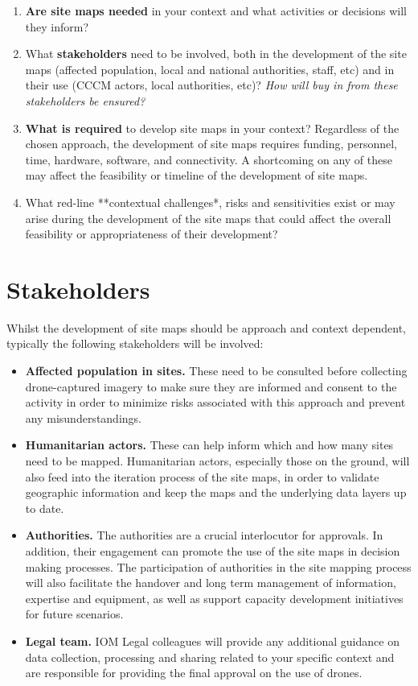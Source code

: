 \documentclass[
  a4paper,
  onecolumn,
  oneside]{book}
\begin{document}
\begin{enumerate}
\def\labelenumi{\arabic{enumi}.}
\item
  \textbf{Are site maps needed} in your context and what activities or
  decisions will they inform?
\item
  What \textbf{stakeholders} need to be involved, both in the
  development of the site maps (affected population, local and national
  authorities, staff, etc) and in their use (CCCM actors, local
  authorities, etc)? \emph{How will buy in from these stakeholders be
  ensured?}
\item
  \textbf{What is required} to develop site maps in your context?
  Regardless of the chosen approach, the development of site maps
  requires funding, personnel, time, hardware, software, and
  connectivity. A shortcoming on any of these may affect the feasibility
  or timeline of the development of site maps.
\item
  What red-line **contextual challenges*, risks and sensitivities exist
  or may arise during the development of the site maps that could affect
  the overall feasibility or appropriateness of their development?
\end{enumerate}

\hypertarget{stakeholders}{%
\section{Stakeholders}\label{stakeholders}}

Whilst the development of site maps should be approach and context
dependent, typically the following stakeholders will be involved:

\begin{itemize}
\item
  \textbf{Affected population in sites.} These need to be consulted
  before collecting drone-captured imagery to make sure they are
  informed and consent to the activity in order to minimize risks
  associated with this approach and prevent any misunderstandings.
\item
  \textbf{Humanitarian actors.} These can help inform which and how many
  sites need to be mapped. Humanitarian actors, especially those on the
  ground, will also feed into the iteration process of the site maps, in
  order to validate geographic information and keep the maps and the
  underlying data layers up to date.
\item
  \textbf{Authorities.} The authorities are a crucial interlocutor for
  approvals. In addition, their engagement can promote the use of the
  site maps in decision making processes. The participation of
  authorities in the site mapping process will also facilitate the
  handover and long term management of information, expertise and
  equipment, as well as support capacity development initiatives for
  future scenarios.
\item
  \textbf{Legal team.} IOM Legal colleagues will provide any additional
  guidance on data collection, processing and sharing related to your
  specific context and are responsible for providing the final approval
  on the use of drones.
\end{itemize}
\end{document}
